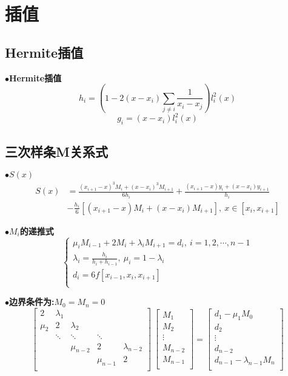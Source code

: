 \documentclass[UTF8]{article}
\newcommand{\keypoint}[2]{$\bullet$\textbf{#1}\quad#2\par}
\begin{document}
\section{插值}
\subsection{Hermite插值}
\keypoint{Hermite插值}{$$
	h_i=\left(1-2(x-x_i)\sum\limits_{j\not=i}\frac{1}{x_i-x_j}\right)l_i^2(x)$$
	$$g_i=(x-x_i)l_i^2(x)$$
}
\subsection{三次样条M关系式}
\keypoint{$S(x)$}{
	\begin{align*}
	S(x)&=\frac{(x_{i+1}-x)^3M_i+(x-x_i)^3M_{i+1}}{6h_i}+\frac{(x_{i+1}-x)y_i+(x-x_i)y_{i+1}}{h_i}\\
	&-\frac{h_i}{6}[(x_{i+1}-x)M_i+(x-x_i)M_{i+1}],\ x\in[x_i,x_{i+1}]
	\end{align*}
}
\keypoint{$M_i$的递推式}{
	$$ \left\{
	\begin{array}{l}
	\mu_iM_{i-1}+2M_i+\lambda_iM_{i+1}=d_i,\ i=1,2,\cdots,n-1\\
	\lambda_i=\frac{h_i}{h_i+h_{i-1}},\ \mu_i=1-\lambda_i\\
	d_i=6f[x_{i-1},x_i,x_{i+1}]\\
	\end{array}
	\right. $$
}
\keypoint{边界条件为:$M_0=M_n=0$}{
	\[ 
	\left[
	\begin{array}{ccccc}
	2 & \lambda_1 & & & \\
	\mu_2 & 2 & \lambda_2 & & \\
	& \ddots & \ddots & \ddots & \\
	& & \mu_{n-2} & 2 & \lambda_{n-2} \\
	& & & \mu_{n-1} & 2 \\
	\end{array}
	\right]
	\ 
	\left[
	\begin{array}{c}
	M_1 \\ M_2 \\ \vdots \\ M_{n-2} \\ M_{n-1} \\
	\end{array}
	\right]
	=
	\left[
	\begin{array}{c}
	d_1-\mu_1M_0 \\ d_2 \\ \vdots \\ d_{n-2} \\ d_{n-1}-\lambda_{n-1}M_n \\
	\end{array}
	\right]
	\]
}
\end{document}

